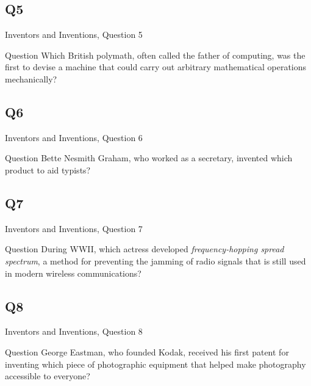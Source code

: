 \documentclass[11pt]{beamer}
\begin{document}
\subsection*{Q5}
\begin{frame}[t]{Inventors and Inventions, Question 5}
\begin{block}{Question}
Which British polymath, often called the father of computing, was the first to devise a machine that could carry out arbitrary mathematical operations mechanically?
\end{block}
\end{frame}
\subsection*{Q6}
\begin{frame}[t]{Inventors and Inventions, Question 6}
\begin{block}{Question}
Bette Nesmith Graham, who worked as a secretary, invented which product to aid typists?
\end{block}
\end{frame}
\subsection*{Q7}
\begin{frame}[t]{Inventors and Inventions, Question 7}
\begin{block}{Question}
During WWII, which actress developed \emph{frequency-hopping spread spectrum}, a method for preventing the jamming of radio signals that is still used in modern wireless communications?
\end{block}
\end{frame}
\subsection*{Q8}
\begin{frame}[t]{Inventors and Inventions, Question 8}
\begin{block}{Question}
George Eastman, who founded Kodak, received his first patent for inventing which piece of photographic equipment that helped make photography accessible to everyone?
\end{block}
\end{frame}
\end{document}
